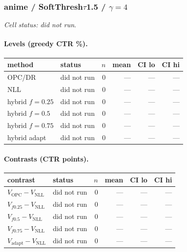 \documentclass[10pt,a4paper]{article}
\begin{document}
\subsubsection{anime / SoftThresh$\tau$1.5 / $\gamma=4$}
\emph{Cell status: did not run}.
\paragraph{Levels (greedy CTR \%).}
{\centering\small\begin{tabular}{llrrrr}
\toprule method & status & $n$ & mean & CI lo & CI hi \\
\midrule
OPC/DR & did not run & 0 & --- & --- & --- \\
NLL & did not run & 0 & --- & --- & --- \\
hybrid $f{=}0.25$ & did not run & 0 & --- & --- & --- \\
hybrid $f{=}0.5$ & did not run & 0 & --- & --- & --- \\
hybrid $f{=}0.75$ & did not run & 0 & --- & --- & --- \\
hybrid adapt & did not run & 0 & --- & --- & --- \\
\bottomrule\end{tabular}\par}
\paragraph{Contrasts (CTR points).}
{\centering\small\begin{tabular}{llrrrr}
\toprule contrast & status & $n$ & mean & CI lo & CI hi \\
\midrule
$V_{\mathrm{OPC}}-V_{\mathrm{NLL}}$ & did not run & 0 & --- & --- & --- \\
$V_{f0.25}-V_{\mathrm{NLL}}$ & did not run & 0 & --- & --- & --- \\
$V_{f0.5}-V_{\mathrm{NLL}}$ & did not run & 0 & --- & --- & --- \\
$V_{f0.75}-V_{\mathrm{NLL}}$ & did not run & 0 & --- & --- & --- \\
$V_{\mathrm{adapt}}-V_{\mathrm{NLL}}$ & did not run & 0 & --- & --- & --- \\
\bottomrule\end{tabular}\par}
\end{document}
